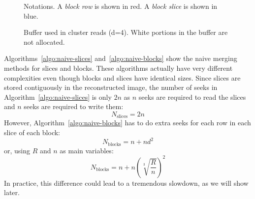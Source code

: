 \documentclass[10pt, conference, compsocconf]{IEEEtran}
\begin{document}
\begin{figure}
  \centering
  \begin{minipage}[b]{0.42\columnwidth}
    \def\svgwidth{0.8\columnwidth}
    
    \caption{Notations. A \emph{block row} is shown in red. A
      \emph{block slice} is shown in blue.}
    \label{fig:notations}
  \end{minipage}
  \quad \quad \quad
  \begin{minipage}[b]{0.42\columnwidth}
    \def\svgwidth{0.8\columnwidth}
    
    \caption{Buffer used in cluster reads (d=4).  White portions in
      the buffer are not allocated. }
    \label{fig:cluster-reads-buffer}
  \end{minipage}
\end{figure}
Algorithms~\ref{algo:naive-slices} and~\ref{algo:naive-blocks} show
the naive merging methods for slices and blocks. These algorithms
actually have very different complexities even though blocks and
slices have identical sizes. Since slices are stored contiguously in
the reconstructed image, the number of seeks in
Algorithm~\ref{algo:naive-slices} is only $2n$ as $n$ seeks are
required to read the slices and $n$ seeks are required to write them:
\begin{equation}
  N_\mathrm{slices} = 2n \label{eq:naive-blocks}
\end{equation}
However,
Algorithm~\ref{algo:naive-blocks} has to do extra seeks for each row
in each slice of each block:
\begin{equation*}
N_\mathrm{blocks} = n+nd^2  
\end{equation*}
or, using $R$ and $n$ as main variables:
\begin{equation}
N_\mathrm{blocks} = n+n\left(\sqrt[3]{\frac{R}{n}}\right)^2 \label{eq:naive-slices}
\end{equation}
In practice, this difference could lead to a tremendous slowdown, as
we will show later.
\end{document}

